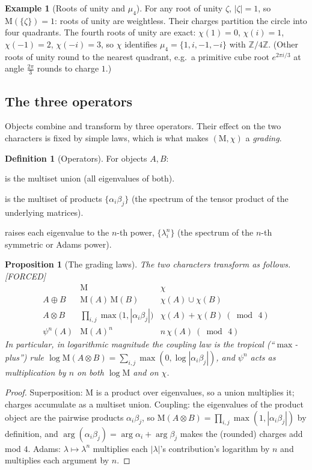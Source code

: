 \documentclass[11pt]{article}
\theoremstyle{plain}
\newtheorem{proposition}[theorem]{Proposition}
\theoremstyle{definition}
\newtheorem{definition}[theorem]{Definition}
\newtheorem{example}[theorem]{Example}
\theoremstyle{remark}
\newcommand{\Forced}{\textcolor{forcedc}{[FORCED]}}
\newcommand{\Mah}{\mathrm{M}}
\begin{document}
\begin{example}[Roots of unity and $μ_4$]\label{ex:mu4}
For any root of unity $ζ$, $|ζ|=1$, so $\Mah(\{ζ\})=1$: roots of unity are weightless. Their charges partition the circle into four quadrants. The fourth roots of unity are exact: $χ(1)=0$, $χ(i)=1$, $χ(-1)=2$, $χ(-i)=3$, so $χ$ identifies $μ_4=\{1,i,-1,-i\}$ with $ℤ/4ℤ$. (Other roots of unity round to the nearest quadrant, e.g.\ a primitive cube root $e^{2πi/3}$ at angle $\tfrac{2π}{3}$ rounds to charge $1$.)
\end{example}

\subsection{The three operators}
Objects combine and transform by three operators. Their effect on the two characters is fixed by simple laws, which is what makes $(\Mah,χ)$ a \emph{grading}.

\begin{definition}[Operators]\label{def:ops}
For objects $A,B$:
\begin{description}[leftmargin=1.6em,style=nextline,itemsep=2pt]
\item[Superposition $A⊕B$] is the multiset union (all eigenvalues of both).
\item[Coupling $A⊗B$] is the multiset of products $\{α_iβ_j\}$ (the spectrum of the tensor product of the underlying matrices).
\item[Adams scaling $ψ^{n}(A)$] raises each eigenvalue to the $n$-th power, $\{λ_i^{n}\}$ (the spectrum of the $n$-th symmetric or Adams power).
\end{description}
\end{definition}

\begin{proposition}[The grading laws]\label{prop:laws}
The two characters transform as follows. \Forced
\[
\begin{array}{l|ll}
 & \Mah & χ \\ \hline
A⊕B & \Mah(A)\,\Mah(B) & χ(A)∪χ(B) \\[2pt]
A⊗B & \displaystyle\prod_{i,j}\max\!\bigl(1,|α_iβ_j|\bigr) & χ(A)+χ(B)\ (\bmod\,4) \\[8pt]
ψ^{n}(A) & \Mah(A)^{n} & n\,χ(A)\ (\bmod\,4)
\end{array}
\]
In particular, in \emph{logarithmic} magnitude the coupling law is the tropical (``$\max$-plus'') rule $\log\Mah(A⊗B)=\sum_{i,j}\max(0,\log|α_iβ_j|)$, and $ψ^{n}$ acts as multiplication by $n$ on both $\log\Mah$ and on $χ$.
\end{proposition}
\begin{proof}
Superposition: $\Mah$ is a product over eigenvalues, so a union multiplies it; charges accumulate as a multiset union. Coupling: the eigenvalues of the product object are the pairwise products $α_iβ_j$, so $\Mah(A⊗B)=\prod_{i,j}\max(1,|α_iβ_j|)$ by definition, and $\arg(α_iβ_j)=\arg α_i+\arg β_j$ makes the (rounded) charges add mod $4$. Adams: $λ↦λ^{n}$ multiplies each $|λ|$'s contribution's logarithm by $n$ and multiplies each argument by $n$.
\end{proof}
\end{document}
